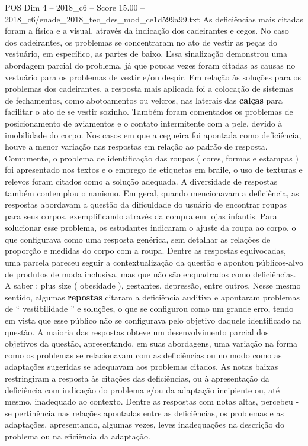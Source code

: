 \begin{textsample}{POS Dim 4 – 2018\_c6 – Score 15.00 – 2018\_c6/enade\_2018\_tec\_des\_mod\_ce1d599a99.txt}
As deficiências mais citadas foram a física e a visual, através da indicação dos cadeirantes e cegos.
No caso dos cadeirantes, os problemas se concentraram no ato de vestir as peças do vestuário, em específico, as partes de baixo.
Essa sinalização demonstrou uma abordagem parcial do problema, já que poucas vezes foram citadas as causas no vestuário para os problemas de vestir e/ou despir.
Em relação às soluções para os problemas dos cadeirantes, a resposta mais aplicada foi a colocação de sistemas de fechamentos, como abotoamentos ou velcros, nas laterais das \textbf{calças} para facilitar o ato de se vestir sozinho.
Também foram comentados os problemas de posicionamento de aviamentos e o contato intermitente com a pele, devido à imobilidade do corpo.
Nos casos em que a cegueira foi apontada como deficiência, houve a menor variação nas respostas em relação ao padrão de resposta.
Comumente, o problema de identificação das roupas ( cores, formas e estampas ) foi apresentado nos textos e o emprego de etiquetas em braile, o uso de texturas e relevos foram citados como a solução adequada.
A diversidade de respostas também contemplou o nanismo.
Em geral, quando mencionavam a deficiência, as respostas abordavam a questão da dificuldade do usuário de encontrar roupas para seus corpos, exemplificando através da compra em lojas infantis.
Para solucionar esse problema, os estudantes indicaram o ajuste da roupa ao corpo, o que configurava como uma resposta genérica, sem detalhar as relações de proporção e medidas do corpo com a roupa.
Dentre as respostas equivocadas, uma parcela pareceu seguir a contextualização da questão e apontou públicos-alvo de produtos de moda inclusiva, mas que não são enquadrados como deficiências.
A saber : plus size ( obesidade ), gestantes, depressão, entre outros.
Nesse mesmo sentido, algumas \textbf{repostas} citaram a deficiência auditiva e apontaram problemas de “ vestibilidade ” e soluções, o que se configurou como um grande erro, tendo em vista que esse público não se configurava pelo objetivo daquele identificado na questão.
A maioria das respostas obteve um desenvolvimento parcial dos objetivos da questão, apresentando, em suas abordagens, uma variação na forma como os problemas se relacionavam com as deficiências ou no modo como as adaptações sugeridas se adequavam aos problemas citados.
As notas baixas restringiram a resposta às citações das deficiências, ou à apresentação da deficiência com indicação do problema e/ou da adaptação incipiente ou, até mesmo, inadequado ao contexto.
Dentre as respostas com notas altas, percebeu -se pertinência nas relações apontadas entre as deficiências, os problemas e as adaptações, apresentando, algumas vezes, leves inadequações na descrição do problema ou na eficiência da adaptação.

\end{textsample}
